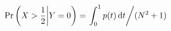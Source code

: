 \[
  \Pr \left( X>\frac12
  \middle\vert Y=0 \right)
= \left.
  \int_0^1 p(t)\,\mathrm{d}t
  \middle/ ( N^2+1 ) \right.
\]
